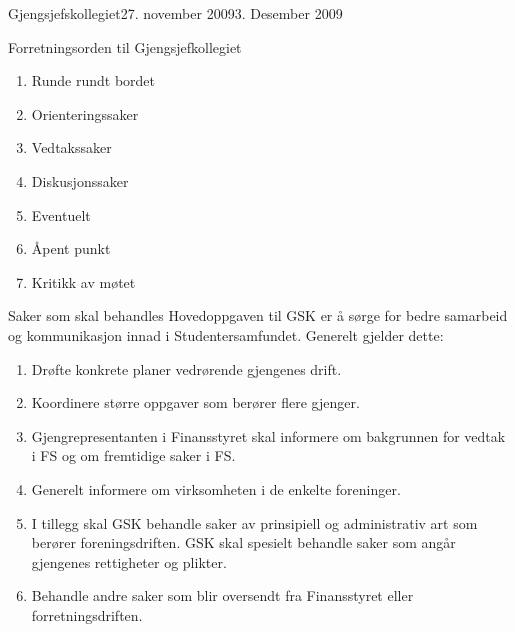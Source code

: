 \begin{instruks}{Gjengsjefskollegiet}{27. november 2009}{3. Desember 2009}
\begin{instruksledd}{Forretningsorden til Gjengsjefkollegiet}
\begin{enumerate}
\begin{enumerate}
\begin{enumerate}
                            \item Runde rundt bordet
                            \item Orienteringssaker
                            \item Vedtakssaker
                            \item Diskusjonssaker
                            \item Eventuelt
                            \item Åpent punkt
                            \item Kritikk av møtet
                        \end{enumerate}
                \end{enumerate}
        \end{enumerate}
    \end{instruksledd}

    \begin{instruksledd}{Saker som skal behandles}
        Hovedoppgaven til GSK er å sørge for bedre samarbeid og kommunikasjon innad i
        Studentersamfundet. Generelt
        gjelder dette:
        \begin{enumerate}
            \item Drøfte konkrete planer vedrørende gjengenes drift.
            \item Koordinere større oppgaver som berører flere gjenger.
            \item Gjengrepresentanten i Finansstyret skal informere om bakgrunnen for
                vedtak i FS og om fremtidige saker i FS.
            \item Generelt informere om virksomheten i de enkelte foreninger.
            \item I tillegg skal GSK behandle saker av prinsipiell og administrativ art
                som berører foreningsdriften. GSK skal
                spesielt behandle saker som angår gjengenes rettigheter og plikter.
            \item Behandle andre saker som blir oversendt fra Finansstyret eller
                forretningsdriften.
        \end{enumerate}

    \end{instruksledd}
\end{instruks}







